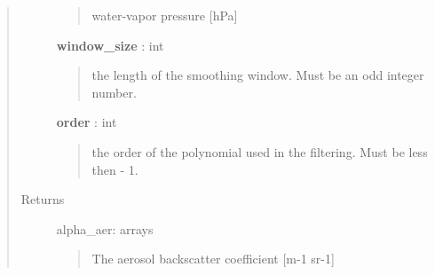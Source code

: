 \documentclass[letterpaper,10pt,english]{sphinxmanual}
\begin{document}
\begin{fulllineitems}
\begin{quote}
\begin{description}
\begin{quote}
water-vapor pressure {[}hPa{]}
\end{quote}

\textbf{window\_size} : int
\begin{quote}

the length of the smoothing window. Must be an odd integer number.
\end{quote}

\textbf{order} : int
\begin{quote}

the order of the polynomial used in the filtering.
Must be less then  - 1.
\end{quote}

\item[{Returns}] \leavevmode
alpha\_aer: arrays
\begin{quote}

The aerosol backscatter coefficient {[}m-1 sr-1{]}
\end{quote}

\end{description}\end{quote}

\end{fulllineitems}

\end{document}
